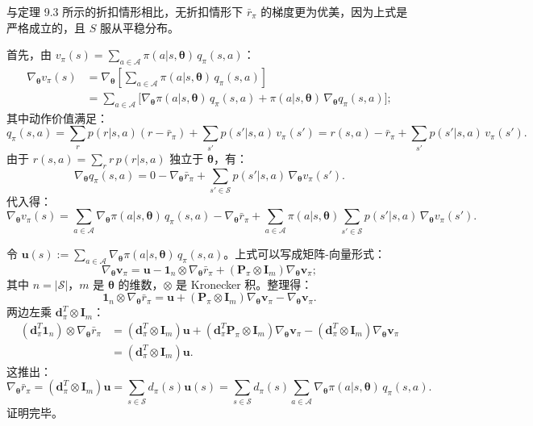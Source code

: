 \documentclass[UTF8]{article}
\begin{document}
与定理 9.3 所示的折扣情形相比，无折扣情形下 $\bar{r}_\pi$ 的梯度更为优美，因为上式是严格成立的，且 $S$ 服从平稳分布。

\begin{proofbox}
首先，由 $v_\pi(s) = \sum_{a \in \mathcal{A}} \pi(a|s, \boldsymbol{\theta}) \, q_\pi(s,a)$：
\begin{align*}
\nabla_{\boldsymbol{\theta}} v_\pi(s) &= \nabla_{\boldsymbol{\theta}} \left[ \sum_{a \in \mathcal{A}} \pi(a|s, \boldsymbol{\theta}) \, q_\pi(s,a) \right] \\
&= \sum_{a \in \mathcal{A}} \bigl[ \nabla_{\boldsymbol{\theta}} \pi(a|s, \boldsymbol{\theta}) \, q_\pi(s,a) + \pi(a|s, \boldsymbol{\theta}) \, \nabla_{\boldsymbol{\theta}} q_\pi(s,a) \bigr];
\end{align*}
其中动作价值满足：
\[
q_\pi(s,a) = \sum_{r} p(r|s,a) (r - \bar{r}_\pi) + \sum_{s'} p(s'|s,a) \, v_\pi(s')
= r(s,a) - \bar{r}_\pi + \sum_{s'} p(s'|s,a) \, v_\pi(s').
\]
由于 $r(s,a) = \sum_{r} r \, p(r|s,a)$ 独立于 $\boldsymbol{\theta}$，有：
\[
\nabla_{\boldsymbol{\theta}} q_\pi(s,a) = 0 - \nabla_{\boldsymbol{\theta}} \bar{r}_\pi + \sum_{s' \in \mathcal{S}} p(s'|s,a) \, \nabla_{\boldsymbol{\theta}} v_\pi(s').
\]
代入得：
\[
\nabla_{\boldsymbol{\theta}} v_\pi(s) = \sum_{a \in \mathcal{A}} \nabla_{\boldsymbol{\theta}} \pi(a|s, \boldsymbol{\theta}) \, q_\pi(s,a) - \nabla_{\boldsymbol{\theta}} \bar{r}_\pi + \sum_{a \in \mathcal{A}} \pi(a|s, \boldsymbol{\theta}) \sum_{s' \in \mathcal{S}} p(s'|s,a) \, \nabla_{\boldsymbol{\theta}} v_\pi(s').
\]

令 $\boldsymbol{u}(s) := \sum_{a \in \mathcal{A}} \nabla_{\boldsymbol{\theta}} \pi(a|s, \boldsymbol{\theta}) \, q_\pi(s,a)$。上式可以写成矩阵-向量形式：
\[
\nabla_{\boldsymbol{\theta}} \boldsymbol{v}_\pi = \boldsymbol{u} - \boldsymbol{1}_n \otimes \nabla_{\boldsymbol{\theta}} \bar{r}_\pi + (\boldsymbol{P}_\pi \otimes \boldsymbol{I}_m) \nabla_{\boldsymbol{\theta}} \boldsymbol{v}_\pi;
\]
其中 $n = |\mathcal{S}|$，$m$ 是 $\boldsymbol{\theta}$ 的维数，$\otimes$ 是 Kronecker 积。整理得：
\[
\boldsymbol{1}_n \otimes \nabla_{\boldsymbol{\theta}} \bar{r}_\pi = \boldsymbol{u} + (\boldsymbol{P}_\pi \otimes \boldsymbol{I}_m) \nabla_{\boldsymbol{\theta}} \boldsymbol{v}_\pi - \nabla_{\boldsymbol{\theta}} \boldsymbol{v}_\pi.
\]
两边左乘 $\boldsymbol{d}_\pi^T \otimes \boldsymbol{I}_m$：
\begin{align*}
(\boldsymbol{d}_\pi^T \boldsymbol{1}_n) \otimes \nabla_{\boldsymbol{\theta}} \bar{r}_\pi
&= (\boldsymbol{d}_\pi^T \otimes \boldsymbol{I}_m) \boldsymbol{u} + (\boldsymbol{d}_\pi^T \boldsymbol{P}_\pi \otimes \boldsymbol{I}_m) \nabla_{\boldsymbol{\theta}} \boldsymbol{v}_\pi - (\boldsymbol{d}_\pi^T \otimes \boldsymbol{I}_m) \nabla_{\boldsymbol{\theta}} \boldsymbol{v}_\pi \\
&= (\boldsymbol{d}_\pi^T \otimes \boldsymbol{I}_m) \boldsymbol{u}.
\end{align*}
这推出：
\[
\nabla_{\boldsymbol{\theta}} \bar{r}_\pi = (\boldsymbol{d}_\pi^T \otimes \boldsymbol{I}_m) \boldsymbol{u}
= \sum_{s \in \mathcal{S}} d_\pi(s) \boldsymbol{u}(s)
= \sum_{s \in \mathcal{S}} d_\pi(s) \sum_{a \in \mathcal{A}} \nabla_{\boldsymbol{\theta}} \pi(a|s, \boldsymbol{\theta}) \, q_\pi(s,a).
\]
证明完毕。
\end{proofbox}
\end{document}
